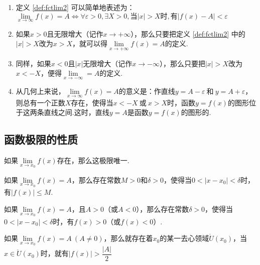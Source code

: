 \begin{note}
	\begin{enumerate}
		\item 定义 \ref{def:fctlim2} 可以简单地表述为：\( \lim\limits_{x \to \infty}f(x) = A \Leftrightarrow \forall \varepsilon > 0, \exists X > 0,\text{当}|x|>X\text{时},\text{有}|f(x) - A| < \varepsilon \)
		\item 如果\( x > 0 \)且无限增大（记作\( x \to +\infty \)），那么只要把定义 \ref{def:fctlim2} 中的\( |x| > X \)改为\( x > X \)，就可以得\( \lim\limits_{x \to +\infty}f(x) = A \)的定义.
		\item 同样，如果\( x < 0 \)且\( |x| \)无限增大（记作\( x \to -\infty \)），那么只要把\( |x| > X \)改为\( x < -X \)，便得\( \lim\limits_{x \to -\infty} = A \)的定义.
		\item 从几何上来说，\( \lim\limits_{x \to \infty}f(x) = A \)的意义是：作直线\( y = A - \varepsilon\ \text{和}\ y = A + \varepsilon \)，则总有一个正数\( X \)存在，使得当\( x < -X\ \text{或}\ x > X \)时，函数\( y = f(x) \)的图形位于这两条直线之间.这时，直线\( y = A \)是函数\( y = f(x) \)的图形的.
	\end{enumerate}
\end{note}

\subsection{函数极限的性质}

\begin{theorem}[唯一性]
	如果\( \lim\limits_{x \to x_{0}}f(x) \)存在，那么这极限唯一.
\end{theorem}
\begin{theorem}[局部有界性]
	如果\( \lim\limits_{x \to x_{0}}f(x) = A \)，那么存在常数\( M > 0 \)和\( \delta > 0 \)，使得当\( 0 < |x - x_{0}| < \delta \)时，有\( |f(x)| \leqslant M \).
\end{theorem}
\begin{theorem}[局部保号性]
	如果\( \lim\limits_{x \to x_{0}}f(x) = A \)，且\( A > 0 \)（或\( A < 0 \)），那么存在常数\( \delta > 0 \)，使得当\( 0 < |x - x_{0}| < \delta \)时，有\( f(x) > 0 \)（或\( f(x) < 0 \)）.
\end{theorem}

\begin{theorem}
	如果\( \lim\limits_{x \to x _{0}}f(x) = A\ (A \neq 0) \)，那么就存在着\( x_{0} \)的某一去心领域\( \mathring{U}(x_{0}) \)，当\( x \in \mathring{U}(x_{0}) \)时，就有\( |f(x) | > \dfrac{|A|}{2} \)
\end{theorem}

